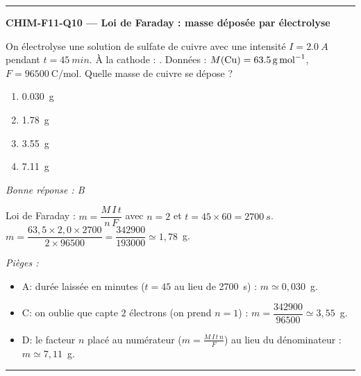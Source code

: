 \documentclass[11pt,a4paper]{article}
\begin{document}
\vspace{8pt}\hrule\vspace{8pt}
\noindent\textbf{CHIM-F11-Q10 --- Loi de Faraday : masse déposée par électrolyse}\par
On électrolyse une solution de sulfate de cuivre  avec une intensité $I=\qty{2.0}{A}$ pendant $t=\qty{45}{min}$. À la cathode : . Données : $M(\ce{Cu})=\qty{63.5}{\gram\per\mole}$, $F=\qty{96500}{\coulomb\per\mole}$. Quelle masse de cuivre se dépose ?
\begin{enumerate}[label=\Alph*)]
\item \qty{0.030}{\gram}
\item \qty{1.78}{\gram}
\item \qty{3.55}{\gram}
\item \qty{7.11}{\gram}
\end{enumerate}
\textit{Bonne réponse : B}\par
Loi de Faraday : $m=\dfrac{M\,I\,t}{n\,F}$ avec $n=2$ et $t=45\times60=\qty{2700}{s}$. $m=\dfrac{63{,}5\times2{,}0\times2700}{2\times96500}=\dfrac{342900}{193000}\simeq 1{,}78$~g.\par
\textit{Pièges :}
\begin{itemize}
\item A: durée laissée en minutes ($t=45$ au lieu de \qty{2700}{s}) : $m\simeq 0{,}030$~g.
\item C: on oublie que  capte $2$ électrons (on prend $n=1$) : $m=\dfrac{342900}{96500}\simeq 3{,}55$~g.
\item D: le facteur $n$ placé au numérateur ($m=\frac{M\,I\,t\,n}{F}$) au lieu du dénominateur : $m\simeq 7{,}11$~g.
\end{itemize}
\vspace{8pt}\hrule\vspace{8pt}
\end{document}

